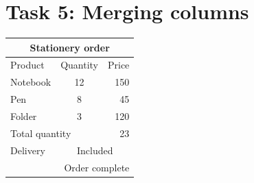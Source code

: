 \documentclass{article}
\begin{document}
\section*{Task 5: Merging columns}

\begin{tabular}{|l|c|r|}
\hline
\multicolumn{3}{|c|}{Stationery order} \\
\hline
Product & Quantity & Price \\
\hline
Notebook & 12 & 150 \\
Pen & 8 & 45 \\
Folder & 3 & 120 \\
\hline
\multicolumn{2}{|l|}{Total quantity} & 23 \\
\hline
Delivery & \multicolumn{2}{c|}{Included} \\
\hline
\multicolumn{3}{|r|}{Order complete} \\
\hline
\end{tabular}
\end{document}
